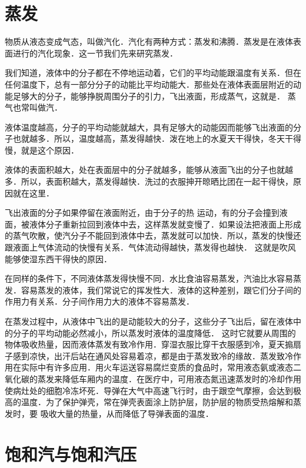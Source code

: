 \section{蒸发}
物质从液态变成气态，叫做汽化．汽化有两种方式：蒸发和沸腾．蒸发是在液体表面进行的汽化现象．这一节我们先来研究蒸发．

我们知道，液体中的分子都在不停地运动着，它们的平均动能跟温度有关系．但在任何温度下，总有一部分分子的动能比平均动能大．那些处在液体表面层附近的动能足够大的分子，能够挣脱周围分子的引力，飞出液面，形成蒸气，这就是．
蒸气也常叫做汽．

液体温度越高，分子的平均动能就越大，具有足够大的动能因而能够飞出液面的分子也就越多．所以，温度越高，蒸发得越快．泼在地上的水夏天干得快，冬天干得慢，就是这个原因．

液体的表面积越大，处在表面层中的分子就越多，能够从液面飞出的分子也就越多．所以，表面积越大，蒸发得越快．洗过的衣服抻开晾晒比团在一起干得快，原因就在这里．

飞出液面的分子如果停留在液面附近，由于分子的热
运动，有的分子会撞到液面，被液体分子重新拉回到液体中去，这样蒸发就变慢了．如果设法把液面上形成的蒸气吹散，使汽分子不能回到液体中去，蒸发就可以加快．所以，蒸发的快慢还跟液面上气体流动的快慢有关系．气体流动得越快，蒸发得也越快．
这就是吹风能够使湿东西干得快的原因．

在同样的条件下，不同液体蒸发得快慢不同．水比食油容易蒸发，汽油比水容易蒸发．容易蒸发的液体，我们常说它的挥发性大．液体的这种差别，跟它们分子间的作用力有关系．分子间作用力大的液体不容易蒸发．

在蒸发过程中，从液体中飞出的是动能较大的分子，这些分子飞出后，留在液体中的分子的平均动能必然减小，所以蒸发时液体的温度降低．
这时它就要从周围的物体吸收热量，因而液体蒸发有致冷作用．穿湿衣服比穿干衣服感到冷，夏天搧扇子感到凉快，出汗后站在通风处容易着凉，都是由于蒸发致冷的缘故．蒸发致冷作用在实际中有许多应用．用火车运送容易腐烂变质的食品时，常用液态氨或液态二氧化碳的蒸发来降低车厢内的温度．在医疗中，可用液态氮迅速蒸发时的冷却作用使病灶处的细胞冷冻坏死．导弹在大气中高速飞行时，由于跟空气摩擦，会达到极高的温度．为了保护弹壳，常在弹壳表面涂上防护层，防护层的物质受热熔解和蒸发时，要
吸收大量的热量，从而降低了导弹表面的温度．

\section{饱和汽与饱和汽压}
